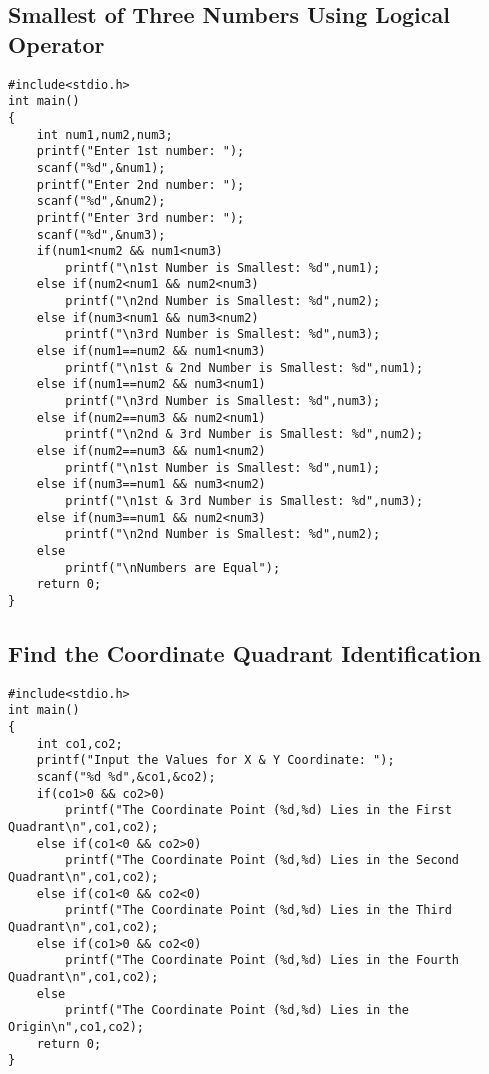 \documentclass[a4paper,14pt]{article}
\begin{document}
\subsection{Smallest of Three Numbers Using Logical Operator}
\vspace{0.5cm}
\begin{lstlisting}[caption={Smallest of Three Numbers Using Logical Operator}]
#include<stdio.h>
int main()
{
    int num1,num2,num3;
    printf("Enter 1st number: ");
    scanf("%d",&num1);
    printf("Enter 2nd number: ");
    scanf("%d",&num2);
    printf("Enter 3rd number: ");
    scanf("%d",&num3);
    if(num1<num2 && num1<num3)
        printf("\n1st Number is Smallest: %d",num1);
    else if(num2<num1 && num2<num3)
        printf("\n2nd Number is Smallest: %d",num2);
    else if(num3<num1 && num3<num2)
        printf("\n3rd Number is Smallest: %d",num3);
    else if(num1==num2 && num1<num3)
        printf("\n1st & 2nd Number is Smallest: %d",num1);
    else if(num1==num2 && num3<num1)
        printf("\n3rd Number is Smallest: %d",num3);
    else if(num2==num3 && num2<num1)
        printf("\n2nd & 3rd Number is Smallest: %d",num2);
    else if(num2==num3 && num1<num2)
        printf("\n1st Number is Smallest: %d",num1);
    else if(num3==num1 && num3<num2)
        printf("\n1st & 3rd Number is Smallest: %d",num3);
    else if(num3==num1 && num2<num3)
        printf("\n2nd Number is Smallest: %d",num2);
    else
        printf("\nNumbers are Equal");
    return 0;
}
\end{lstlisting}
\newpage

\subsection{Find the Coordinate Quadrant Identification}
\vspace{0.5cm}
\begin{lstlisting}[caption={Find the Coordinate Quadrant Identification}]
#include<stdio.h>
int main()
{
    int co1,co2;
    printf("Input the Values for X & Y Coordinate: ");
    scanf("%d %d",&co1,&co2);
    if(co1>0 && co2>0)
        printf("The Coordinate Point (%d,%d) Lies in the First Quadrant\n",co1,co2);
    else if(co1<0 && co2>0)
        printf("The Coordinate Point (%d,%d) Lies in the Second Quadrant\n",co1,co2);
    else if(co1<0 && co2<0)
        printf("The Coordinate Point (%d,%d) Lies in the Third Quadrant\n",co1,co2);
    else if(co1>0 && co2<0)
        printf("The Coordinate Point (%d,%d) Lies in the Fourth Quadrant\n",co1,co2);
    else
        printf("The Coordinate Point (%d,%d) Lies in the Origin\n",co1,co2);
    return 0;
}
\end{lstlisting}
\newpage
\end{document}
